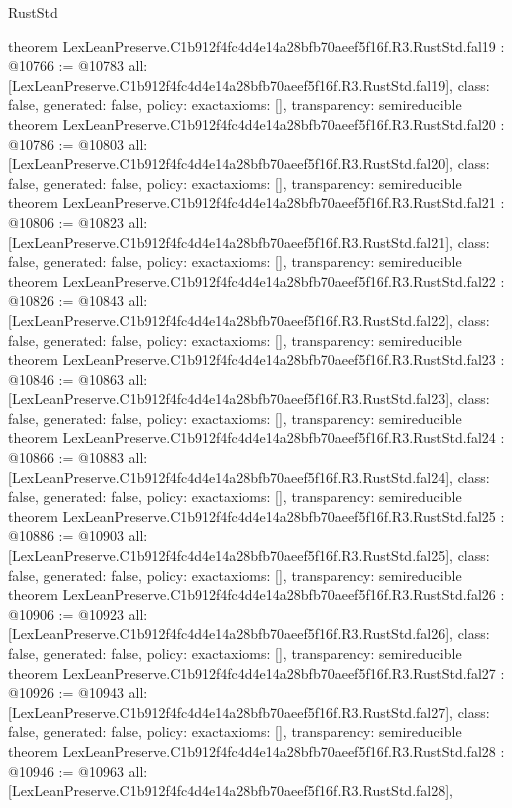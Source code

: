 \begin{lexlean}{RustStd}
\begin{coremodule}
{}
theorem LexLeanPreserve.C1b912f4fc4d4e14a28bfb70aeef5f16f.R3.RustStd.fal19 : @10766 := @10783 {
  all: [LexLeanPreserve.C1b912f4fc4d4e14a28bfb70aeef5f16f.R3.RustStd.fal19],
  class: false,
  generated: false,
  policy: exact{axioms: []},
  transparency: semireducible
}
theorem LexLeanPreserve.C1b912f4fc4d4e14a28bfb70aeef5f16f.R3.RustStd.fal20 : @10786 := @10803 {
  all: [LexLeanPreserve.C1b912f4fc4d4e14a28bfb70aeef5f16f.R3.RustStd.fal20],
  class: false,
  generated: false,
  policy: exact{axioms: []},
  transparency: semireducible
}
theorem LexLeanPreserve.C1b912f4fc4d4e14a28bfb70aeef5f16f.R3.RustStd.fal21 : @10806 := @10823 {
  all: [LexLeanPreserve.C1b912f4fc4d4e14a28bfb70aeef5f16f.R3.RustStd.fal21],
  class: false,
  generated: false,
  policy: exact{axioms: []},
  transparency: semireducible
}
theorem LexLeanPreserve.C1b912f4fc4d4e14a28bfb70aeef5f16f.R3.RustStd.fal22 : @10826 := @10843 {
  all: [LexLeanPreserve.C1b912f4fc4d4e14a28bfb70aeef5f16f.R3.RustStd.fal22],
  class: false,
  generated: false,
  policy: exact{axioms: []},
  transparency: semireducible
}
theorem LexLeanPreserve.C1b912f4fc4d4e14a28bfb70aeef5f16f.R3.RustStd.fal23 : @10846 := @10863 {
  all: [LexLeanPreserve.C1b912f4fc4d4e14a28bfb70aeef5f16f.R3.RustStd.fal23],
  class: false,
  generated: false,
  policy: exact{axioms: []},
  transparency: semireducible
}
theorem LexLeanPreserve.C1b912f4fc4d4e14a28bfb70aeef5f16f.R3.RustStd.fal24 : @10866 := @10883 {
  all: [LexLeanPreserve.C1b912f4fc4d4e14a28bfb70aeef5f16f.R3.RustStd.fal24],
  class: false,
  generated: false,
  policy: exact{axioms: []},
  transparency: semireducible
}
theorem LexLeanPreserve.C1b912f4fc4d4e14a28bfb70aeef5f16f.R3.RustStd.fal25 : @10886 := @10903 {
  all: [LexLeanPreserve.C1b912f4fc4d4e14a28bfb70aeef5f16f.R3.RustStd.fal25],
  class: false,
  generated: false,
  policy: exact{axioms: []},
  transparency: semireducible
}
theorem LexLeanPreserve.C1b912f4fc4d4e14a28bfb70aeef5f16f.R3.RustStd.fal26 : @10906 := @10923 {
  all: [LexLeanPreserve.C1b912f4fc4d4e14a28bfb70aeef5f16f.R3.RustStd.fal26],
  class: false,
  generated: false,
  policy: exact{axioms: []},
  transparency: semireducible
}
theorem LexLeanPreserve.C1b912f4fc4d4e14a28bfb70aeef5f16f.R3.RustStd.fal27 : @10926 := @10943 {
  all: [LexLeanPreserve.C1b912f4fc4d4e14a28bfb70aeef5f16f.R3.RustStd.fal27],
  class: false,
  generated: false,
  policy: exact{axioms: []},
  transparency: semireducible
}
theorem LexLeanPreserve.C1b912f4fc4d4e14a28bfb70aeef5f16f.R3.RustStd.fal28 : @10946 := @10963 {
  all: [LexLeanPreserve.C1b912f4fc4d4e14a28bfb70aeef5f16f.R3.RustStd.fal28],
}
\end{coremodule}
\end{lexlean}
